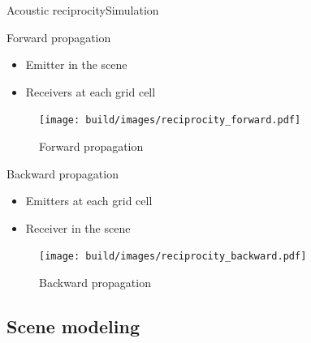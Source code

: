 \documentclass[9pt, xcolor={usenames, dvipsnames}]{beamer}
\begin{document}
				\begin{frame}{Acoustic reciprocity}{Simulation}
					\centering
					\begin{minipage}[t]{0.47\textwidth}
						\centering
						\begin{block}{Forward propagation}
							\begin{itemize}
								\item Emitter in the scene
								\item Receivers at each grid cell
							\end{itemize}
						\end{block}
						\begin{figure}
							\texttt{[image: build/images/reciprocity\_forward.pdf]}
							\caption{Forward propagation}
						\end{figure}
					\end{minipage}
					\hfill
					\begin{minipage}[t]{0.47\textwidth}
						\centering
						\begin{block}{Backward propagation}
							\begin{itemize}
								\item Emitters at each grid cell
								\item Receiver in the scene
							\end{itemize}
						\end{block}
						\begin{figure}
							\texttt{[image: build/images/reciprocity\_backward.pdf]}
							\caption{Backward propagation}
						\end{figure}
					\end{minipage}
				\end{frame}

			\subsection{Scene modeling}
\end{document}
